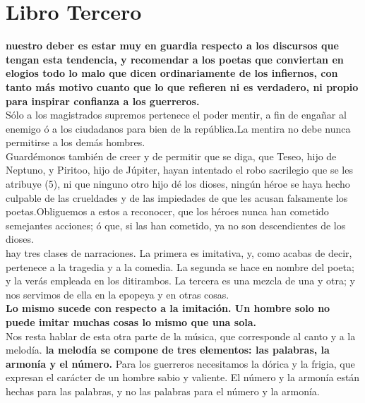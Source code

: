 \documentclass[10pt]{book}
\begin{document}
\chapter*{Libro Tercero}
\textbf{nuestro deber es estar muy en guardia respecto a los discursos que tengan esta tendencia, y recomendar a los poetas que conviertan en elogios todo lo malo que dicen ordinariamente de los infiernos, con tanto más motivo cuanto que lo que refieren ni es verdadero, ni propio para inspirar confianza a los guerreros.}\\
Sólo a los magistrados supremos pertenece el poder mentir, a fin de engañar al enemigo ó a los ciudadanos para bien de la república.La mentira no debe nunca permitirse a los demás hombres.\\
Guardémonos también de creer y de permitir que se diga, que Teseo, hijo de Neptuno, y Piritoo, hijo de Júpiter, hayan intentado el robo sacrilegio que se les atribuye (5), ni que ninguno otro hijo dé los dioses, ningún héroe se haya hecho culpable de las crueldades y de las impiedades de que les acusan falsamente los poetas.Obliguemos a estos a reconocer, que los héroes nunca han cometido semejantes acciones; ó que, si las han cometido, ya no son descendientes de los dioses.\\
 hay tres clases de narraciones. La primera es imitativa, y, como acabas de decir, pertenece a la tragedia y a la comedia. La segunda se hace en nombre del poeta; y la verás empleada en los ditirambos. La tercera es una mezcla de una y otra; y nos servimos de ella en la epopeya y en otras cosas.\\
 \textbf{ Lo mismo sucede con respecto a la imitación. Un hombre solo no puede imitar muchas cosas lo mismo que una sola.}\\
Nos resta hablar de esta otra parte de la música, que corresponde al canto y a la melodía. \textbf{la melodía se compone de tres elementos: las palabras, la armonía y el número.} Para los guerreros necesitamos la dórica y la frigia, que expresan el carácter de un hombre sabio y valiente. El número y la armonía están hechas para las palabras, y no las palabras para el número y la armonía. \\\\
\end{document}
